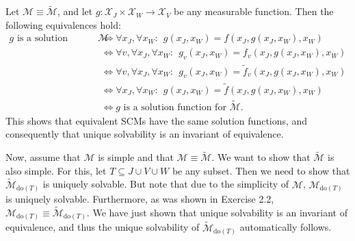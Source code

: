 \begin{gradedsolution}
\begin{enumerate}
      Let $\mathcal{M} \equiv \widetilde{\mathcal{M}}$, and let $g: \mathcal{X}_J \times \mathcal{X}_W \to \mathcal{X}_V$ be any measurable function.
      Then the following equivalences hold:
      \begin{align*}
	g \text{ is a solution function for } \mathcal{M} & \Longleftrightarrow \forall x_J, \forall x_W: \ \ g(x_J, x_W) = f(x_J, g(x_J, x_W), x_W) \\
	&   \Longleftrightarrow \forall v, \forall x_J, \forall x_W: \ \ g_v(x_J, x_W) = f_v(x_J, g(x_J, x_W), x_W) \\
	&  \Longleftrightarrow   \forall v, \forall x_J, \forall x_W: \ \ g_v(x_J, x_W) = \widetilde{f}_v(x_J, g(x_J, x_W), x_W) \\
	& \Longleftrightarrow   \forall x_J, \forall x_W: \ \ g(x_J, x_W) = \widetilde{f}(x_J, g(x_J, x_W), x_W) \\
	& \Longleftrightarrow g \text{ is a solution function for } \widetilde{\mathcal{M}}.
      \end{align*}
      This shows that equivalent SCMs have the same solution functions, and consequently that unique solvability is an invariant of equivalence.

      Now, assume that $\mathcal{M}$ is simple and that $\mathcal{M} \equiv \widetilde{\mathcal{M}}$.
      We want to show that $\widetilde{\mathcal{M}}$ is also simple.
      For this, let $T \subseteq J \cup V \cup W$ be any subset.
      Then we need to show that $\widetilde{\mathcal{M}}_{\text{do}(T)}$ is uniquely solvable.
      But note that due to the simplicity of $\mathcal{M}$, $\mathcal{M}_{\text{do}(T)}$ is uniquely solvable. 
      Furthermore, as was shown in Exercise 2.2, $\mathcal{M}_{\text{do}(T)} \equiv \widetilde{\mathcal{M}}_{\text{do}(T)}$.
      We have just shown that unique solvability is an invariant of equivalence, and thus the unique solvability of $\widetilde{\mathcal{M}}_{\text{do}(T)}$ automatically follows.


\end{enumerate}
\end{gradedsolution}
